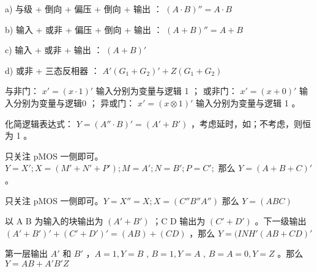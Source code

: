\documentclass[lang=cn,11pt,a4paper,cite=authoryear]{elegantpaper}
\begin{document}
a) 与级 + 倒向 + 偏压 + 倒向 + 输出 ： \((A \cdot B)'' = A \cdot B\)

b) 输入 + 或非 + 偏压 + 倒向 + 输出 ： \((A + B)'' = A + B\)

c) 输入 + 或非 + 输出 ： \((A + B)'\)

d) 或非 + 三态反相器 ： \(A' (G_1 + G_2)' + Z (G_1 + G_2)\)


与非门： \(x' = (x \cdot 1)'\) 输入分别为变量与逻辑 1 ；
或非门： \(x' = (x + 0)'\) 输入分别为变量与逻辑0 ；
异或门： \(x' = (x \otimes 1)'\) 输入分别为变量与逻辑 1 。


化简逻辑表达式： \(Y = (A'' \cdot B)' = (A' + B')\) ，考虑延时，如；不考虑，则恒为 1 。







只关注 pMOS 一侧即可。\(Y = X'; X = (M' + N' + P'); M = A'; N = B'; P = C';\) 那么 \(Y = (A+B+C)'\) 。


只关注 pMOS 一侧即可。\(Y = X'' = X; X = (C'' B'' A'')\) 那么 \(Y = (A B C)\)


以 A B 为输入的块输出为 \((A'+B')\) ；C D 输出为 \((C'+D')\) 。下一级输出 \((A'+B')' + (C'+D')' = (AB)+(CD)\) ，那么 \(Y = (INH' (AB+CD)'\)


第一层输出 \(A'\) 和 \(B'\) ，\(A = 1, Y = B\) , \(B = 1, Y = A\) , \(B = A = 0, Y = Z\) 。那么 \(Y = AB + A'B'Z\)

\end{document}
